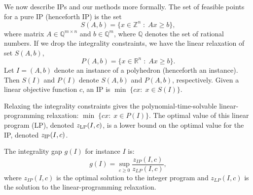 We now describe IPs and our methods more formally. The set of feasible points for a pure IP (henceforth IP) is the set
\begin{equation}
S(A,b)= \{x\in \mathbb{Z}^{n}\;:\; Ax\geq b\}  \label{S},
\end{equation}
where matrix $A\in \mathbb{Q}^{m\times n}$ and $b \in \mathbb{Q}^{m}$, where $\mathbb{Q}$ denotes the set of rational numbers. If we drop the integrality constraints, we have the linear relaxation of set $S(A,b)$,
\begin{equation}
P(A,b) = \{x\in \mathbb{R}^{n}\;:\; Ax\geq b\}. \label{P}
\end{equation}
Let $I=(A,b)$ denote an instance of a polyhedron (henceforth an instance). Then $S(I)$ and $P(I)$ denote $S(A,b)$ and $P(A,b)$, respectively. Given a linear objective function $c$, an IP is $\min \;\{cx:\; x \in S(I)\}$. 

Relaxing the integrality constraints gives the polynomial-time-solvable linear-programming relaxation: $\min \;\{cx:\;x\in P(I) \}$.  The optimal value of this linear program (LP), denoted $z_{\operatorname{LP}}(I,c)$, is a lower bound on the optimal value for the IP, denoted $z_{\operatorname{IP}}(I,c)$. 


\begin{definition}\label{IGofPoly}
The integrality gap $g(I)$ for instance $I$ is: $$g(I)= \sup_{c\geq 0}\frac{z_{IP}(I,c)}{z_{LP}(I,c)},$$
where $z_{IP}(I,c)$ is the optimal solution to the integer program and $z_{LP}(I,c)$ is the solution to the linear-programming relaxation.
\end{definition}


